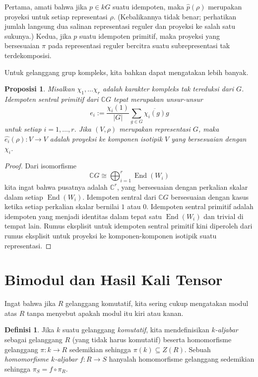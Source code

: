 \documentclass[12pt]{article}
\theoremstyle{plain}
\newtheorem{proposition}[theorem]{Proposisi}
\theoremstyle{definition}
\newtheorem{definition}[theorem]{Definisi}
\theoremstyle{remark}
\numberwithin{equation}{section}
\begin{document}
Pertama, amati bahwa jika $p \in kG$ suatu idempoten,
maka $\widehat{p}(\rho)$ merupakan proyeksi untuk setiap representasi $\rho$.
(Kebalikannya tidak benar; perhatikan jumlah langsung dua salinan representasi
reguler dan proyeksi ke salah satu sukunya.)
Kedua, jika $p$ suatu idempoten primitif, maka proyeksi
yang bersesuaian $\pi$ pada representasi reguler bercitra suatu
subrepresentasi tak terdekomposisi.

Untuk gelanggang grup kompleks, kita bahkan dapat mengatakan lebih banyak.

\begin{proposition}
Misalkan $\chi_1,\ldots \chi_r$ adalah karakter kompleks tak tereduksi dari $G$.
Idempoten sentral primitif dari $\mathbb{C}G$ tepat merupakan
unsur-unsur
\[
e_i := \frac{\chi_i(1)}{|G|} \sum_{g\in G} \overline{\chi_i(g)} g
\]
untuk setiap $i=1,\ldots,r$.
Jika $(V,\rho)$ merupakan representasi $G$, maka
$\widehat{e_i}(\rho) : V \to V$ adalah proyeksi ke komponen
isotipik $V$ yang bersesuaian dengan $\chi_i$.
\end{proposition}

\begin{proof}
Dari isomorfisme
\[
\mathbb{C}G \cong \bigoplus_{i=1}^r \operatorname{End}(W_i)
\]
kita ingat bahwa pusatnya adalah $\mathbb{C}^r$,
yang bersesuaian dengan perkalian skalar dalam setiap
$\operatorname{End}(W_i)$.
Idempoten sentral dari $\mathbb{C}G$
bersesuaian dengan kasus ketika setiap perkalian skalar bernilai $1$ atau $0$.
Idempoten sentral primitif adalah idempoten yang menjadi identitas
dalam tepat satu $\operatorname{End}(W_i)$ dan trivial di tempat lain.
Rumus eksplisit untuk idempoten sentral primitif kini diperoleh
dari rumus eksplisit untuk proyeksi ke komponen-komponen
isotipik suatu representasi. 
\end{proof}

\section{Bimodul dan Hasil Kali Tensor}

Ingat bahwa jika $R$ gelanggang komutatif, kita sering cukup mengatakan modul atas $R$
tanpa menyebut apakah modul itu kiri atau kanan.

\begin{definition}
Jika $k$ suatu gelanggang \emph{komutatif}, kita mendefinisikan
\emph{$k$-aljabar} sebagai gelanggang $R$ (yang tidak harus komutatif) beserta
homomorfisme gelanggang $\pi : k \to R$ sedemikian sehingga $\pi(k) \subseteq Z(R)$.
Sebuah \emph{homomorfisme $k$-aljabar} $f : R \to S$ hanyalah homomorfisme
gelanggang sedemikian sehingga $\pi_S = f \circ \pi_R$.
\end{definition}
\end{document}

